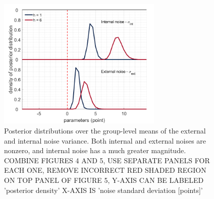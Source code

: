 \documentclass[12pt]{article}
\begin{document}
	
	\begin{figure}[h]
		\begin{center}
			\includegraphics[width=0.7\textwidth]{figures/dist_hypernoiseh.png}
			\caption[Posterior distributions over the group-level means of the external and internal noise variance.]{Posterior distributions over the group-level means of the external and internal noise variance. Both internal and external noises are nonzero, and internal noise has a much greater magnitude. COMBINE FIGURES 4 AND 5, USE SEPARATE PANELS FOR EACH ONE, REMOVE INCORRECT RED SHADED REGION ON TOP PANEL OF FIGURE 5, Y-AXIS CAN BE LABELED 'posterior density' X-AXIS IS 'noise standard deviation [points]'}
			\label{fig:mb1}
		\end{center}
	\end{figure}
	
	
	
	
\end{document}
